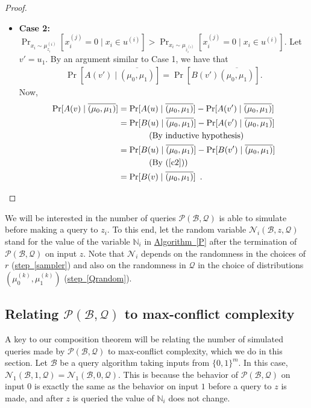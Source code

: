 \documentclass[11pt]{article}
\numberwithin{equation}{section}
\theoremstyle{definition}
\theoremstyle{plain}
\newcommand{\N}{\mathbb N}
\newcommand{\expref}[2]{\hyperref[#2]{#1~\ref{#2}}}
\newcommand{\clB}{\mathcal{B}}
\newcommand{\clQ}{\mathcal{Q}}
\newcommand{\clP}{\mathcal{P}}
\newcommand{\clN}{\mathcal{N}}
\newcommand{\ccc}{max-conflict complexity}
\begin{document}
\begin{proof}
\begin{description}
\begin{itemize}
\item {\bf Case 2:} $\Pr_{x_i \sim \mu_{z_i}^{(i)}}[x_i^{(j)}=0 \mid x_i \in u^{(i)}] > \Pr_{x_i \sim \mu_{\overline{z}_i^{(i)}}}[x_i^{(j)}=0 \mid x_i \in u^{(i)}]$.
Let $v'=u_1$. By an argument similar to Case 1, we have that 
\begin{align}
\Pr[A(v') \mid \overline{(\mu_0,\mu_1)}]=\Pr[B(v') \overline{(\mu_0,\mu_1)}]. \label{c2}
\end{align}
Now,
\begin{align}
\Pr[A(v) \mid \overline{(\mu_0,\mu_1)}] &=\Pr[A(u) \mid \overline{(\mu_0,\mu_1)}] - \Pr[A(v') \mid \overline{(\mu_0,\mu_1)}] \nonumber \\
&= \Pr[B(u) \mid \overline{(\mu_0,\mu_1)}] - \Pr[A(v') \mid \overline{(\mu_0,\mu_1)}]  \nonumber \\
&\mbox{\ \ \ \ \ \ \ \ \ \ \ (By inductive hypothesis)} \nonumber \\
&= \Pr[B(u) \mid \overline{(\mu_0,\mu_1)}] - \Pr[B(v') \mid \overline{(\mu_0,\mu_1)}] \nonumber \\
&\mbox{\ \ \ \ \ \ \ \ \ \ \ (By (\ref{c2}))} \nonumber \\
&= \Pr[B(v) \mid \overline{(\mu_0,\mu_1)}] \enspace. \nonumber
\end{align}
\end{itemize}
\end{description}
\end{proof}

We will be interested in the number of queries $\clP(\clB,\clQ)$ is able to simulate before making a query to $z_i$.  To this end, 
let the random variable $\clN_i(\clB, z, \clQ)$ stand for the value of the variable $\N_i$ in \expref{Algorithm}{P} after the termination of $\clP(\clB, \clQ)$ on input $z$.  Note that $\clN_i$ depends on the 
randomness in the choices of $r$ (\expref{step}{sampler}) and also on the randomness in $\clQ$ in the choice of distributions $(\mu_0^{(k)}, \mu_1^{(k)})$ (\expref{step}{Qrandom}).
%
\subsection{\texorpdfstring{Relating $\clP(\clB, \clQ)$ to \ccc}{Relating
    P(B,Q) to max-conflict complexity}}
A key to our composition theorem will be relating the number of simulated queries made by $\clP(\clB, \clQ)$ to \ccc, which 
we do in this section.  Let $\clB$ be a query algorithm taking inputs from $\{0,1\}^m$.  In this case, 
$\clN_1(\clB, 1, \clQ) = \clN_1(\clB, 0, \clQ)$.  This is because the behavior of $\clP(\clB, \clQ)$ on input 
$0$ is exactly the same as the behavior on input $1$ before a query to $z$ is made, and after $z$ is queried the value of $\N_i$ does not change.
\end{document}
